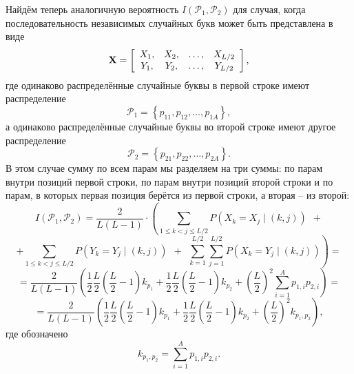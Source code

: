 Найдём теперь аналогичную вероятность $I\left( {\mathcal{P}_1 ,\mathcal{P}_2 } \right)$ для случая, когда последовательность независимых случайных букв может быть представлена в виде
\[
\mathbf{X} = \left[ {\begin{array}{*{20}c}
   {X_1 ,}  \\
   {Y_1 ,}  \\
 \end{array} \begin{array}{*{20}c}
   {X_2 ,}  \\
   {Y_2 ,}  \\
 \end{array} \begin{array}{*{20}c}
   { \ldots ,}  \\
   { \ldots ,}  \\
 \end{array} \begin{array}{*{20}c}
   {X_{L/2} }  \\
   {Y_{L/2} }  \\
 \end{array} } \right],
\]
где одинаково распределённые случайные буквы в первой строке имеют распределение
    \[ \mathcal{P}_1  = \left\{ {p_{11} ,p_{12} , \ldots , p_{1A} } \right\}, \]
а одинаково распределённые случайные буквы во второй строке имеют другое распределение
    \[ \mathcal{P}_2  = \left\{ {p_{21} ,p_{22} , \ldots , p_{2A} } \right\}. \]
В этом случае сумму по всем парам мы разделяем на три суммы: по парам внутри позиций первой строки, по парам внутри позиций второй строки и по парам, в которых первая позиция берётся из первой строки, а вторая -- из второй:
{ \small
\[
    I(\mathcal{P}_1, \mathcal{P}_2) =
        \frac{2}{L(L - 1)} \cdot \left(
        \sum \limits_{1 \leq k < j \leq L/2} P( X_k  = X_j \mid ( k,j )) ~~ + \right.
\] \[
        \left. + \sum\limits_{1 \leq k < j \leq L/2} P(Y_k  = Y_j \mid (k,j)) ~~+~~
            \sum\limits_{k=1}^{L/2} \sum\limits_{j=1}^{L/2} {P(X_k = Y_j \mid (k,j))} \right) =
\] \[
    = \frac{2}{L(L - 1)} \left( \frac{1}{2} \frac{L}{2} \left( \frac{L}{2} - 1 \right) k_{p_1} +
        \frac{1}{2} \frac{L}{2} \left( \frac{L}{2} - 1 \right) k_{p_2} +
        \left( \frac{L}{2} \right)^2 \sum \limits_{i = 1}^A p_{1,i} p_{2,i} \right) =
\] \[
    = \frac{2}{L(L - 1)} \left( \frac{1}{2} \frac{L}{2} \left( \frac{L}{2} - 1 \right) k_{p_1} +
        \frac{1}{2} \frac{L}{2} \left( \frac{L}{2} - 1 \right) k_{p_2} +
        \left( \frac{L}{2} \right)^2 k_{p_1, p_2} \right),
\] }
где обозначено
    \[ k_{p_1, p_2}  = \sum\limits_{i=1}^A p_{1,i} p_{2,i}. \]



